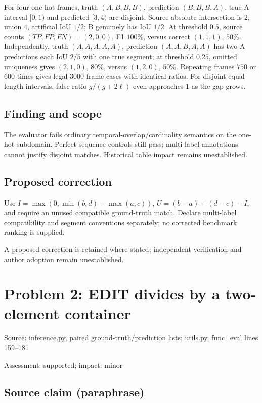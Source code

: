 \documentclass[11pt]{article}
\begin{document}
For four one-hot frames, truth \((A,B,B,B)\), prediction \((B,B,B,A)\), true A interval \([0,1)\) and predicted \([3,4)\) are disjoint. Source absolute intersection is \(2\), union \(4\), artificial IoU \(1/2\); B genuinely has IoU \(1/2\). At threshold \(0.5\), source counts \((TP,FP,FN)=(2,0,0)\), F1 \(100\%\), versus correct \((1,1,1)\), \(50\%\). Independently, truth \((A,A,A,A,A)\), prediction \((A,A,B,A,A)\) has two A predictions each IoU \(2/5\) with one true segment; at threshold \(0.25\), omitted uniqueness gives \((2,1,0)\), \(80\%\), versus \((1,2,0)\), \(50\%\). Repeating frames \(750\) or \(600\) times gives legal \(3000\)-frame cases with identical ratios. For disjoint equal-length intervals, false ratio \(g/(g+2\ell)\) even approaches \(1\) as the gap grows.

\subsection*{Finding and scope}

The evaluator fails ordinary temporal-overlap/cardinality semantics on the one-hot subdomain. Perfect-sequence controls still pass; multi-label annotations cannot justify disjoint matches. Historical table impact remains unestablished.

\subsection*{Proposed correction}

Use \(I=\max(0,\min(b,d)-\max(a,c))\), \(U=(b-a)+(d-c)-I\), and require an unused compatible ground-truth match. Declare multi-label compatibility and segment conventions separately; no corrected benchmark ranking is supplied.

A proposed correction is retained where stated; independent verification and author adoption remain unestablished.

\section*{Problem 2: EDIT divides by a two-element container}

Source: inference.py, paired ground-truth/prediction lists; utils.py, func\_eval lines 159–181

Assessment: supported; impact: minor

\subsection*{Source claim (paraphrase)}
\end{document}
